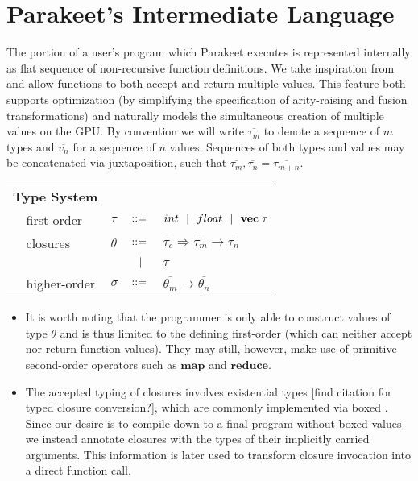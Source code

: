\documentclass[preprint]{sigplanconf}
\begin{document}
\section{Parakeet's Intermediate Language}
The portion of a user's program which Parakeet executes is represented internally as flat sequence of non-recursive function definitions. 
We take inspiration from \cite{Bol09} and allow functions to both accept and return multiple values. This feature both supports optimization (by simplifying the specification of arity-raising and fusion transformations) and naturally models the simultaneous creation of multiple values on the GPU. By convention we will write $\overline{\tau_m}$ to denote a sequence of $m$ types and $\overline{v_n}$ for a sequence  of $n$ values. Sequences of both types and values may be concatenated via juxtaposition, such that $\overline{\tau_m}, \overline{\tau_n} = \overline{\tau_{m+n}}$. 
\\[5pt]
\begin{tabular}{m{0.005cm}m{1.8cm}m{0.05cm}m{0.2cm}p{4.8cm}}
\multicolumn{2}{l}{\textbf{Type System}} & & &  \\
& first-order     & $\tau$    & $::=$ & $int \ \ | \ \  float \ \ | \ \  \mathbf{vec} \; \tau   $ \\[4pt]
& closures        & $\theta$  & $::=$ & $\overline{\tau_{c}} \Rightarrow \overline{\tau_m} \rightarrow \overline{\tau_n}$\\[2pt]
&                 &           & $\ \ | \ \ $    & $\tau$ \\[4pt]
& higher-order    & $\sigma$  & $::=$ & $\overline{\theta_m} \rightarrow \overline{\theta_n} $ \\[4pt]
\end{tabular}
\begin{itemize}
\item It is worth noting that the programmer is only able to construct values of type $\theta$ and is thus limited to the defining first-order (which can neither accept nor return function values). They may still, however, make use of primitive second-order operators such as $\mathbf{map}$ and $\mathbf{reduce}$. 
\item The accepted typing of closures involves existential types [find citation for typed closure conversion?], which are commonly implemented via boxed . Since our desire is to compile down to a final program without boxed values we instead annotate closures with the types of their implicitly carried arguments. This information is later used to transform closure invocation into a direct function call. 
\end{itemize}
\end{document}
